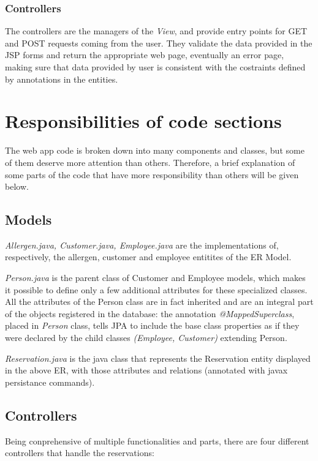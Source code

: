 \documentclass{article}
\begin{document}
\subsubsection*{Controllers}
The controllers are the managers of the \textit{View}, and provide entry points for GET and POST requests coming from the user. They validate the data provided in the JSP forms and return the appropriate web page, eventually an error page, making sure that data provided by user is consistent with the costraints defined by annotations in the entities. 

\vspace{10mm}
\section*{Responsibilities of code sections}
The web app code is broken down into many components and classes, but some of them deserve more attention than others. Therefore, a brief explanation of some parts of the code that have more responsibility than others will be given below.

\subsection*{Models}
\textit{Allergen.java, Customer.java, Employee.java} are the implementations of, respectively, the allergen, customer and employee entitites of the ER Model.

\textit{Person.java} is the parent class of Customer and Employee models, which makes it possible to define only a few additional attributes for these specialized classes. All the attributes of the Person class are in fact inherited and are an integral part of the objects registered in the database: the annotation \textit{@MappedSuperclass}, placed in \textit{Person} class, tells JPA to include the base class properties as if they were declared by the child classes \textit{(Employee, Customer)} extending Person. 

\textit{Reservation.java} is the java class that represents
the Reservation entity displayed in the above ER, with those attributes and relations
 (annotated with javax persistance commands).

\subsection*{Controllers}
Being conprehensive of multiple functionalities and parts, there are four different
controllers that handle the reservations:
\end{document}
